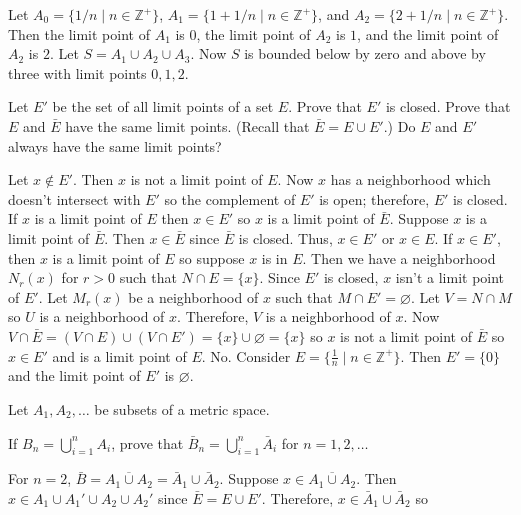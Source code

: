 \begin{exercise}
  Let \(A_0 = \{1/n\mid n\in\mathbb{Z}^+\}\),
  \(A_1 = \{1 + 1/n\mid n\in\mathbb{Z}^+\}\), and
  \(A_2 = \{2 + 1/n\mid n\in\mathbb{Z}^+\}\).
  Then the limit point of \(A_1\) is \(0\), the limit point of \(A_2\) is
  \(1\), and the limit point of \(A_2\) is \(2\).
  Let \(S = A_1\cup A_2\cup A_3\).
  Now \(S\) is bounded below by zero and above by three with limit points
  \(0,1,2\).
\item
  Let \(E'\) be the set of all limit points of a set \(E\).
  Prove that \(E'\) is closed.
  Prove that \(E\) and \(\bar{E}\) have the same limit points.
  (Recall that \(\bar{E} = E\cup E'\).)
  Do \(E\) and \(E'\) always have the same limit points?
  \par\smallskip
  Let \(x\not\in E'\).
  Then \(x\) is not a limit point of \(E\).
  Now \(x\) has a neighborhood which doesn't intersect with \(E'\) so the
  complement of \(E'\) is open; therefore, \(E'\) is closed.
  If \(x\) is a limit point of \(E\) then \(x\in E'\) so \(x\) is a limit point
  of \(\bar{E}\).
  Suppose \(x\) is a limit point of \(\bar{E}\).
  Then \(x\in\bar{E}\) since \(\bar{E}\) is closed.
  Thus, \(x\in E'\) or \(x\in E\).
  If \(x\in E'\), then \(x\) is a limit point of \(E\) so suppose \(x\) is in
  \(E\).
  Then we have a neighborhood \(N_r(x)\) for \(r > 0\) such that
  \(N\cap E = \{x\}\).
  Since \(E'\) is closed, \(x\) isn't a limit point of \(E'\).
  Let \(M_r(x)\) be a neighborhood of \(x\) such that
  \(M\cap E' = \varnothing\).
  Let \(V = N\cap M\) so \(U\) is a neighborhood of \(x\).
  Therefore, \(V\) is a neighborhood of \(x\).
  Now
  \(V\cap\bar{E} = (V\cap E)\cup (V\cap E') = \{x\}\cup\varnothing = \{x\}\) so
  \(x\) is not a limit point of \(\bar{E}\) so \(x\in E'\) and is a limit point
  of \(E\).
  No.
  Consider \(E = \{\frac{1}{n}\mid n\in\mathbb{Z}^+\}\).
  Then \(E' = \{0\}\) and the limit point of \(E'\) is \(\varnothing\).
\item
  Let \(A_1, A_2, \ldots\) be subsets of a metric space.
  \begin{exercise}[label = (\alph*), ref = \arabic{exercisei} (\alph*)]
  \item
    \label{1.7.a}
    If \(B_n = \bigcup_{i = 1}^nA_i\), prove that
    \(\bar{B}_n = \bigcup_{i = 1}^n\bar{A}_i\) for \(n = 1, 2, \ldots\)
    \par\smallskip
    For \(n = 2\), \(\bar{B} = \overline{A_1\cup A_2} =
    \bar{A}_1\cup \bar{A}_2\).
    Suppose \(x\in\overline{A_1 \cup A_2}\).
    Then \(x\in A_1\cup A_1'\cup A_2\cup A_2'\) since \(\bar{E} = E\cup E'\).
    Therefore, \(x\in\bar{A}_1\cup\bar{A}_2\) so

\end{exercise}
\end{exercise}
